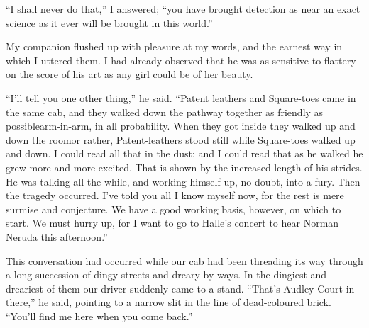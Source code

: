 \documentclass[12pt,english]{book}
\begin{document}
{}``I shall never do that,'' I answered; {}``you have brought detection
as near an exact science as it ever will be brought in this world.''

My companion flushed up with pleasure at my words, and the earnest
way in which I uttered them. I had already observed that he was as
sensitive to flattery on the score of his art as any girl could be
of her beauty.

{}``I'll tell you one other thing,'' he said. {}``Patent leathers
and Square-toes came in the same cab, and they walked down the pathway
together as friendly as possible\mdsh{---}arm-in-arm, in all probability.
When they got inside they walked up and down the room\mdsh{---}or
rather, Patent-leathers stood still while Square-toes walked up and
down. I could read all that in the dust; and I could read that as
he walked he grew more and more excited. That is shown by the increased
length of his strides. He was talking all the while, and working himself
up, no doubt, into a fury. Then the tragedy occurred. I've told you
all I know myself now, for the rest is mere surmise and conjecture.
We have a good working basis, however, on which to start. We must
hurry up, for I want to go to Halle's concert to hear Norman Neruda
this afternoon.''

This conversation had occurred while our cab had been threading its
way through a long succession of dingy streets and dreary by-ways.
In the dingiest and dreariest of them our driver suddenly came to
a stand. {}``That's Audley Court in there,'' he said, pointing to
a narrow slit in the line of dead-coloured brick. {}``You'll find
me here when you come back.''
\end{document}
